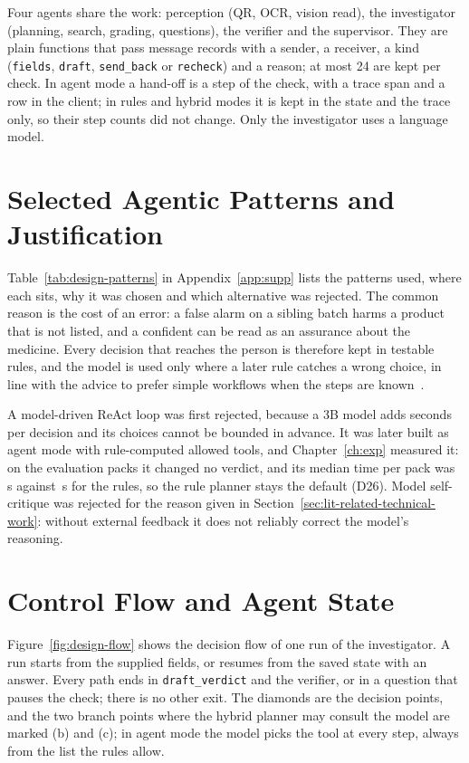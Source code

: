 Four agents share the work: perception (QR, OCR, vision read), the investigator (planning, search, grading,
questions), the verifier and the supervisor. They are plain functions that pass message records with a sender, a receiver,
a kind (\texttt{fields}, \texttt{draft}, \texttt{send\_back} or \texttt{recheck}) and a reason; at most 24 are kept per check.
In agent mode a hand-off is a step of the check, with a trace span and a row in the client; in rules and hybrid modes it is
kept in the state and the trace only, so their step counts did not change. Only the investigator uses a language model.


\section{Selected Agentic Patterns and Justification}
\label{sec:design-selected-agentic-patterns-and-justification}

Table~\ref{tab:design-patterns} in Appendix~\ref{app:supp} lists the patterns used, where each sits, why it was chosen and
which alternative was rejected. The common reason is the cost of an error: a false alarm on a
sibling batch harms a product that is not listed, and a confident \NLISTED{} can be read as an
assurance about the medicine. Every decision that reaches the person is therefore kept in testable
rules, and the model is used only where a later rule catches a wrong choice, in line with the advice
to prefer simple workflows when the steps are known~\cite{schluntz2024building}.

A model-driven ReAct loop was first rejected, because a 3B model adds seconds per decision and its choices cannot
be bounded in advance. It was later built as agent mode with rule-computed allowed tools, and Chapter~\ref{ch:exp}
measured it: on the \ResN{} evaluation packs it changed no verdict, and its median time per pack was
\,s against \,s for the rules, so the rule planner stays the default (D26). Model self-critique was rejected for the reason given
in Section~\ref{sec:lit-related-technical-work}: without external feedback it does not reliably
correct the model's reasoning.

\section{Control Flow and Agent State}
\label{sec:design-control-flow-and-agent-state}

Figure~\ref{fig:design-flow} shows the decision flow of one run of the investigator. A run starts
from the supplied fields, or resumes from the saved state with an answer. Every path ends in
\texttt{draft\_verdict} and the verifier, or in a question that pauses the check; there is no other
exit. The diamonds are the decision points, and the two branch points where the hybrid planner may
consult the model are marked (b) and (c); in agent mode the model picks the tool at every step, always
from the list the rules allow.

